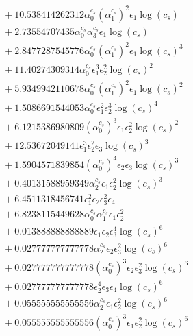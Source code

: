 \documentclass[10pt]{article}
\begin{document}
\begin{align*}
&{}  + 10.538414262312 \alpha_{0}^{c_s} \left(\alpha_{1}^{c_s}\right)^{2} \epsilon_{1} \log{\left(c_{s} \right)} \\
&{}  + 2.73554707435 \alpha_{0}^{c_s} \alpha_{3}^{c_s} \epsilon_{1} \log{\left(c_{s} \right)} \\
&{}  + 2.8477287545776 \alpha_{0}^{c_s} \left(\alpha_{1}^{c_s}\right)^{2} \epsilon_{1} \log{\left(c_{s} \right)}^{3} \\
&{}  + 11.40274309314 \alpha_{0}^{c_s} \epsilon_{1}^{3} \epsilon_{2}^{2} \log{\left(c_{s} \right)}^{2} \\
&{}  + 5.9349942110678 \alpha_{0}^{c_s} \left(\alpha_{1}^{c_s}\right)^{2} \epsilon_{1} \log{\left(c_{s} \right)}^{2} \\
&{}  + 1.5086691544053 \alpha_{0}^{c_s} \epsilon_{1}^{2} \epsilon_{2}^{3} \log{\left(c_{s} \right)}^{4} \\
&{}  + 6.1215386980809 \left(\alpha_{0}^{c_s}\right)^{3} \epsilon_{1} \epsilon_{2}^{2} \log{\left(c_{s} \right)}^{2} \\
&{}  + 12.53672049141 \epsilon_{1}^{3} \epsilon_{2}^{2} \epsilon_{3} \log{\left(c_{s} \right)}^{3} \\
&{}  + 1.5904571839854 \left(\alpha_{0}^{c_s}\right)^{4} \epsilon_{2} \epsilon_{3} \log{\left(c_{s} \right)}^{3} \\
&{}  + 0.40131588959349 \alpha_{2}^{c_s} \epsilon_{1} \epsilon_{2}^{2} \log{\left(c_{s} \right)}^{3} \\
&{}  + 6.4511318456741 \epsilon_{1}^{2} \epsilon_{2} \epsilon_{3}^{2} \epsilon_{4} \\
&{}  + 6.8238115449628 \alpha_{0}^{c_s} \alpha_{1}^{c_s} \epsilon_{1} \epsilon_{2}^{2} \\
&{}  + 0.013888888888889 \epsilon_{1} \epsilon_{2} \epsilon_{3}^{4} \log{\left(c_{s} \right)}^{6} \\
&{}  + 0.027777777777778 \alpha_{2}^{c_s} \epsilon_{2} \epsilon_{3}^{2} \log{\left(c_{s} \right)}^{6} \\
&{}  + 0.027777777777778 \left(\alpha_{0}^{c_s}\right)^{3} \epsilon_{2} \epsilon_{3}^{2} \log{\left(c_{s} \right)}^{6} \\
&{}  + 0.027777777777778 \epsilon_{2}^{4} \epsilon_{3} \epsilon_{4} \log{\left(c_{s} \right)}^{6} \\
&{}  + 0.055555555555556 \alpha_{2}^{c_s} \epsilon_{1} \epsilon_{2}^{2} \log{\left(c_{s} \right)}^{6} \\
&{}  + 0.055555555555556 \left(\alpha_{0}^{c_s}\right)^{3} \epsilon_{1} \epsilon_{2}^{2} \log{\left(c_{s} \right)}^{6} \\

\end{align*}
\end{document}
